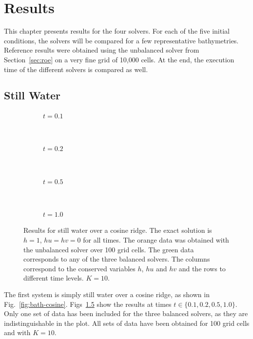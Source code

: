 \chapter{Results}
\label{ch:results}

This chapter presents results for the four solvers. For each of the five initial conditions, the solvers will be compared for a few representative bathymetries. Reference results were obtained using the unbalanced solver from Section~\ref{sec:roe} on a very fine grid of 10,000 cells. At the end, the execution time of the different solvers is compared as well.

\section{Still Water}

\begin{figure}
  \centering
  \begin{subfigure}{\textwidth}
    \caption{$t = 0.1$}
    \label{fig:results-still-1}
  \end{subfigure} \\
  \begin{subfigure}{\textwidth}
    \caption{$t = 0.2$}
    \label{fig:results-still-2}
  \end{subfigure} \\
  \begin{subfigure}{\textwidth}
    \caption{$t = 0.5$}
    \label{fig:results-still-5}
  \end{subfigure} \\
  \begin{subfigure}{\textwidth}
    \caption{$t = 1.0$}
    \label{fig:results-still-10}
  \end{subfigure}
  \caption{Results for still water over a cosine ridge. The exact solution is $h = 1$, $hu = hv = 0$ for all times. The orange data was obtained with the unbalanced solver over 100 grid cells. The green data corresponds to any of the three balanced solvers. The columns correspond to the conserved variables $h$, $hu$ and $hv$ and the rows to different time levels. $K = 10$.}
  \label{fig:results-still}
\end{figure}

The first system is simply still water over a cosine ridge, as shown in Fig.~\ref{fig:bath-cosine}. Figs~\ref{fig:results-still} show the results at times $t \in \{0.1, 0.2, 0.5, 1.0\}$. Only one set of data has been included for the three balanced solvers, as they are indistinguishable in the plot. All sets of data have been obtained for 100 grid cells and with $K = 10$.

